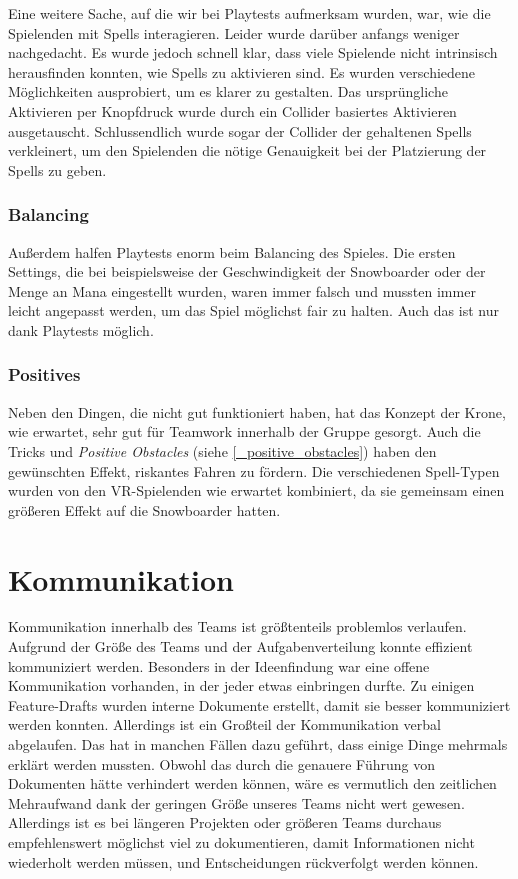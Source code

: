 Eine weitere Sache, auf die wir bei Playtests aufmerksam wurden, war, wie die Spielenden mit Spells interagieren. Leider wurde darüber anfangs weniger nachgedacht. Es wurde jedoch schnell klar, dass viele Spielende nicht intrinsisch herausfinden konnten, wie Spells zu aktivieren sind. Es wurden verschiedene Möglichkeiten ausprobiert, um es klarer zu gestalten. Das ursprüngliche Aktivieren per Knopfdruck wurde durch ein Collider basiertes Aktivieren ausgetauscht. Schlussendlich wurde sogar der Collider der gehaltenen Spells verkleinert, um den Spielenden die nötige Genauigkeit bei der Platzierung der Spells zu geben.

\subsubsection{Balancing}

Außerdem halfen Playtests enorm beim Balancing des Spieles. Die ersten Settings, die bei beispielsweise der Geschwindigkeit der Snowboarder oder der Menge an Mana eingestellt wurden, waren immer falsch und mussten immer leicht angepasst werden, um das Spiel möglichst fair zu halten. Auch das ist nur dank Playtests möglich.

\subsubsection{Positives}

Neben den Dingen, die nicht gut funktioniert haben, hat das Konzept der Krone, wie erwartet, sehr gut für Teamwork innerhalb der Gruppe gesorgt. Auch die Tricks und \emph{Positive Obstacles} (siehe \ref{_positive_obstacles}) haben den gewünschten Effekt, riskantes Fahren zu fördern. Die verschiedenen Spell-Typen wurden von den VR-Spielenden wie erwartet kombiniert, da sie gemeinsam einen größeren Effekt auf die Snowboarder hatten.

\section{Kommunikation}
Kommunikation innerhalb des Teams ist größtenteils problemlos verlaufen. Aufgrund der Größe des Teams und der Aufgabenverteilung konnte effizient kommuniziert werden. Besonders in der Ideenfindung war eine offene Kommunikation vorhanden, in der jeder etwas einbringen durfte. Zu einigen Feature-Drafts wurden interne Dokumente erstellt, damit sie besser kommuniziert werden konnten. Allerdings ist ein Großteil der Kommunikation verbal abgelaufen. Das hat in manchen Fällen dazu geführt, dass einige Dinge mehrmals erklärt werden mussten. Obwohl das durch die genauere Führung von Dokumenten hätte verhindert werden können, wäre es vermutlich den zeitlichen Mehraufwand dank der geringen Größe unseres Teams nicht wert gewesen. Allerdings ist es bei längeren Projekten oder größeren Teams durchaus empfehlenswert möglichst viel zu dokumentieren, damit Informationen nicht wiederholt werden müssen, und Entscheidungen rückverfolgt werden können.

